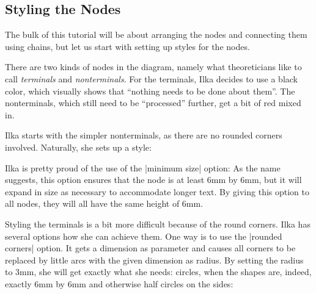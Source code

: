 \subsection{Styling the Nodes}

The bulk of this tutorial will be about arranging the nodes and connecting them
using chains, but let us start with setting up styles for the nodes.

There are two kinds of nodes in the diagram, namely what theoreticians like to
call \emph{terminals} and \emph{nonterminals}. For the terminals, Ilka decides
to use a black color, which visually shows that ``nothing needs to be done
about them''. The nonterminals, which still need to be ``processed'' further,
get a bit of red mixed in.

Ilka starts with the simpler nonterminals, as there are no rounded corners
involved. Naturally, she sets up a style:
%
\begin{codeexample}[libraries/tikz={positioning}]
\end{codeexample}
%
Ilka is pretty proud of the use of the |minimum size| option: As the name
suggests, this option ensures that the node is at least 6mm by 6mm, but it will
expand in size as necessary to accommodate longer text. By giving this option
to all nodes, they will all have the same height of 6mm.

Styling the terminals is a bit more difficult because of the round corners.
Ilka has several options how she can achieve them. One way is to use the
|rounded corners| option. It gets a dimension as parameter and causes all
corners to be replaced by little arcs with the given dimension as radius. By
setting the radius to 3mm, she will get exactly what she needs: circles, when
the shapes are, indeed, exactly 6mm by 6mm and otherwise half circles on the
sides:
%
\begin{codeexample}[libraries/tikz={positioning}]
\end{codeexample}

